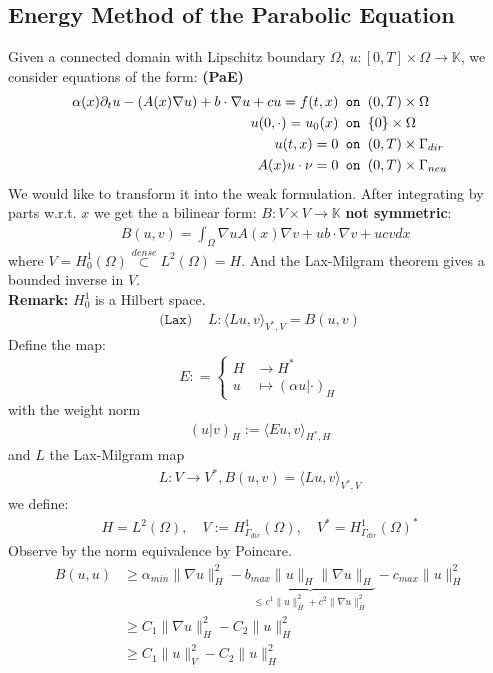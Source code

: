 \documentclass[a4paper,11pt,oneside,fleqn]{book}
\theoremstyle{definition}
\theoremstyle{remark}
\let\div\relax
\DeclareMathOperator{\div}{div}
\begin{document}
\subsection{Energy Method of the Parabolic Equation }
Given a connected domain with Lipschitz boundary $\Omega$, $u: [0, T] \times \Omega \rightarrow \mathbb{K}$,  we consider equations of the form: \textbf{(PaE)}
 \begin{equation}  
 \begin{aligned}
 	\alpha(x) \partial_t u - \div(A(x)\nabla u) + b \cdot \nabla u + c u = f(t, x)   &\texttt{ on }(0, T) \times \Omega \\
 	u(0, \cdot) = u_0(x) &\texttt{ on } \{0\} \times \Omega \\
 	u(t, x) = 0 &\texttt{ on }(0, T) \times \Gamma_{dir}\\
 	A(x) u\cdot \nu = 0 &\texttt{ on } (0, T) \times \Gamma_{neu}
 \end{aligned}	
 \end{equation}
 We would like to transform it into the weak formulation. After integrating by parts w.r.t. $x$ we get the a bilinear form: $B: V \times V \rightarrow \mathbb{K}$ \textbf{not symmetric}:
 \begin{align*}
 	&B(u, v) = \int_\Omega \nabla u A(x) \nabla v + u b \cdot \nabla v + ucv dx 
 \end{align*}
 where $V = H_0^1(\Omega) \overset{dense}{\subset} L^2(\Omega) = H$. And the Lax-Milgram theorem gives a bounded inverse in $V$. \\
 \textbf{Remark:} $H^1_0$ is a Hilbert space.
 \begin{align*}
 	\texttt{(Lax) }
 	&L :  \langle Lu , v \rangle_{V^*, V} = B(u, v)
 \end{align*}
 Define the map:
 \begin{equation*}
 E: = \left\{
 \begin{aligned}
 	H &\rightarrow H^*\\
 	u &\mapsto (\alpha u|\cdot)_H
 \end{aligned}
 \right.
 \end{equation*}
 with the weight norm
 \begin{align*}
 	 (u|v)_H := \langle Eu, v \rangle_{H^*, H}
 \end{align*}
 and $L$ the Lax-Milgram map
 \begin{align*}
 	L: V \rightarrow V^*, B(u, v) = \langle Lu, v \rangle_{V^*, V}
 \end{align*}
 we define:
 \begin{align*}
 	H= L^2(\Omega), \quad V:= H_{\Gamma_{dir}}^1 (\Omega), \quad V^* = H_{\Gamma_{dir}}^1 (\Omega)^*
 \end{align*}
 Observe by the norm equivalence by Poincare.
 \begin{align*}
 	B(u, u) 
 	&\ge \alpha_{min}\|\nabla u \|_{H}^2 - \underbrace{ b_{max}\|u\|_H \|\nabla u \|_H}_{\le c^1\|u\|_H^2 + c^2 \|\nabla u\|^2_H } - c_{max}\|u\|_H^2 \\
 	&\ge C_1 \| \nabla u\|_H^2  - C_2 \|u\|_H^2\\
 	&\ge C_1 \|u\|_V^2 - C_2 \|u\|_H^2
 \end{align*}
 
\end{document}
